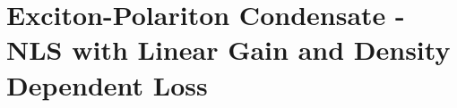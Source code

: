 {%
%
%

\clearpage

{
\section[Exciton-Polariton Condensate - The Nonlinear Schr\"{o}dinger Equation with Linear Gain and Density Dependent Loss]{Exciton-Polariton Condensate -  NLS with Linear Gain and Density Dependent Loss}\label{section:EPCond}}

}

